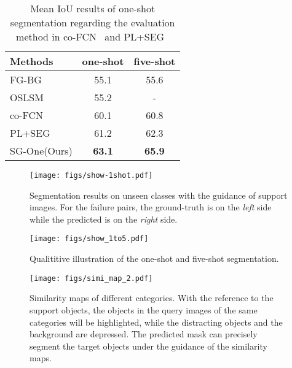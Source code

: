 \documentclass[journal]{IEEEtran}
\begin{document}
\begin{table}[ht]\setlength{\tabcolsep}{22pt}
  \centering
  \caption{Mean IoU results of one-shot segmentation regarding the evaluation method in co-FCN~\cite{rakelly2018conditional} and PL+SEG~\cite{dong2018few}}\label{metric2-tab}
  \begin{tabular}{l|cc}
    \hline
    \hline
    \textbf{Methods} & \textbf{one-shot} & \textbf{five-shot} \\
    \hline
    FG-BG~\cite{rakelly2018conditional} &  55.1 & 55.6 \\
OSLSM~\cite{shaban2017one} &  55.2 & - \\
co-FCN~\cite{rakelly2018conditional} &  60.1 & 	60.8 \\
PL+SEG~\cite{dong2018few} &  61.2  & 62.3 \\
SG-One(Ours) & \textbf{63.1}  & \textbf{65.9}\\
    \hline
    \hline
  \end{tabular}
  \vspace{-10pt}
\end{table}

\begin{figure*}
  \centering
  \texttt{[image: figs/show-1shot.pdf]}
  \caption{Segmentation results on unseen classes with the guidance of support images. For the failure pairs, the ground-truth is on the \textit{left} side while the predicted is on the \textit{right} side.}\label{show-one}
  \vspace{-12pt}
\end{figure*}

\begin{figure}
  \centering
  \texttt{[image: figs/show\_1to5.pdf]}
  \caption{Qualititive illustration of the one-shot and five-shot segmentation.}\label{show-1to5}
  \vspace{-12pt}
\end{figure}

\begin{figure*}
  \centering
  \texttt{[image: figs/simi\_map\_2.pdf]}
  \caption{Similarity maps of different categories. With the reference to the support objects, the objects in the query images of the same categories will be highlighted, while the distracting objects and the background are depressed. The predicted mask can precisely segment the target objects under the guidance of the similarity maps.}\label{simi_map}
  \vspace{-12pt}
\end{figure*}
\end{document}
